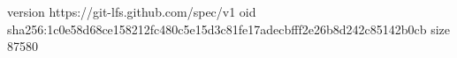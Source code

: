 version https://git-lfs.github.com/spec/v1
oid sha256:1c0e58d68ce158212fc480c5e15d3c81fe17adecbfff2e26b8d242c85142b0cb
size 87580
